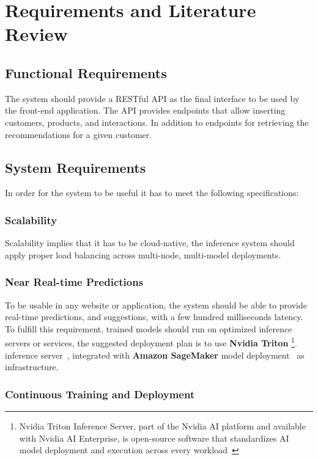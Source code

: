 \chapter{Requirements and Literature Review}
\minitoc 

\section{Functional Requirements}

The system should provide a RESTful API as the final interface to be used by the front-end application.
The API provides endpoints that allow inserting customers, products, and interactions. In addition to endpoints for retrieving the recommendations for a given customer.

\section{System Requirements}

In order for the system to be useful it has to meet the following specifications:

\subsection{Scalability}
Scalability implies that it has to be cloud-native, the inference system should apply proper load balancing across multi-node, multi-model deployments.

\subsection{Near Real-time Predictions}
To be usable in any website or application, the system should be able to provide real-time predictions, and suggestions, with a few hundred milliseconds latency. \\

To fulfill this requirement, trained models should run on optimized inference servers or services, the suggested deployment plan is to use
\textbf{Nvidia Triton}
\footnote{Nvidia Triton Inference Server, part of the Nvidia AI platform and available with Nvidia AI Enterprise, is open-source software that standardizes AI model deployment and execution across every workload~\cite{Triton}}. 
inference server~\cite{Triton}, 
integrated with \textbf{Amazon SageMaker} model deployment~\cite{SageMaker} as infrastructure.

\subsection{Continuous Training and Deployment}

